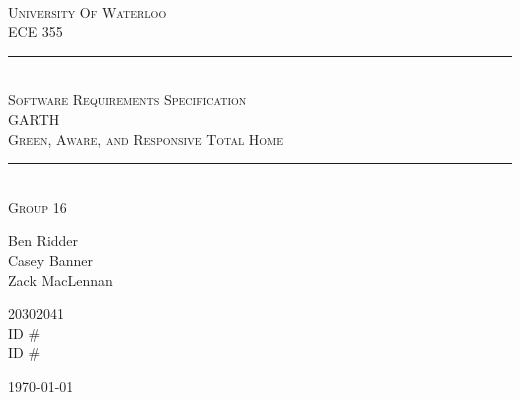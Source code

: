 \begin{titlepage}
\begin{center}
\vfill
\hfill
\\[2cm]
\textsc{\LARGE University Of Waterloo}
\\[1cm]
\textsc{\LARGE ECE 355}
\\[2cm]

\hrule
\hfill
\\[0.5cm]
\textsc{\huge Software Requirements Specification}
\\[0.5cm]
\textsc{\huge GARTH}
\\[0.5cm]
\textsc{\huge Green, Aware, and Responsive Total Home}
\\[0.5cm]
\hrule
\hfill
\\[1cm]
\textsc{\LARGE Group 16} \\[0.4cm]

\begin{minipage}{0.4\textwidth}
\begin{flushleft} \large
Ben Ridder \\
Casey Banner \\
Zack MacLennan
\end{flushleft}
\end{minipage}
\begin{minipage}{0.4\textwidth}
\begin{flushright} \large
20302041 \\
ID \# \\
ID \# 
\end{flushright}
\end{minipage}


\vfill

{\large \today}
\end{center}
\end{titlepage}
